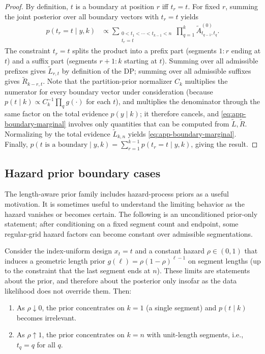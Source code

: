 \begin{proof}
By definition, $t$ is a boundary at position $r$ iff $t_r=t$.
For fixed $r$, summing the joint posterior over all boundary vectors with $t_r=t$ yields
\begin{align}
 p(t_r=t\mid y,k)
 &\propto \sum_{\substack{0<t_1<\cdots<t_{k-1}<n\\ t_r=t}}
 \prod_{q=1}^k \widetilde{A}^{(0)}_{t_{q-1},t_q}.
\end{align}
The constraint $t_r=t$ splits the product into a prefix part (segments $1{:}r$ ending at $t$) and a suffix part (segments $r+1{:}k$ starting at $t$).
Summing over all admissible prefixes gives $\widetilde{L}_{r,t}$ by definition of the DP; summing over all admissible suffixes gives $\widetilde{R}_{k-r,t}$.
Note that the partition-prior normalizer $C_k$ multiplies the numerator for every boundary vector
under consideration (because $p(t\mid k)\propto C_k^{-1}\prod_q g(\cdot)$ for each $t$), and
multiplies the denominator through the same factor on the total evidence $p(y\mid k)$; it
therefore cancels, and \eqref{eq:app-boundary-marginal} involves only quantities that can be
computed from $\widetilde L,\widetilde R$.
Normalizing by the total evidence $\widetilde{L}_{k,n}$ yields \eqref{eq:app-boundary-marginal}.
Finally, $p(t\text{ is a boundary}\mid y,k)=\sum_{r=1}^{k-1}p(t_r=t\mid y,k)$, giving the result.
\end{proof}

\subsection{Hazard prior boundary cases}
\label{app:hazard-cases}

The length-aware prior family includes hazard-process priors as a useful motivation.
It is sometimes useful to understand the limiting behavior as the hazard vanishes or becomes certain.
The following is an unconditioned prior-only statement; after conditioning on a fixed segment count
and endpoint, some regular-grid hazard factors can become constant over admissible segmentations.

\begin{proposition}
\label{prop:hazard-limits}
Consider the index-uniform design $x_t=t$ and a constant hazard $\rho\in(0,1)$ that induces a geometric length prior
$g(\ell)=\rho(1-\rho)^{\ell-1}$ on segment lengths (up to the constraint that the last segment ends at $n$).
These limits are statements about the prior, and therefore about the posterior only insofar as
the data likelihood does not override them. Then:
\begin{enumerate}[label=(\roman*)]
\item As $\rho\downarrow 0$, the prior concentrates on $k=1$ (a single segment) and $p(t\mid k)$ becomes irrelevant.
\item As $\rho\uparrow 1$, the prior concentrates on $k=n$ with unit-length segments, i.e., $t_q=q$ for all $q$.
\end{enumerate}
\end{proposition}

